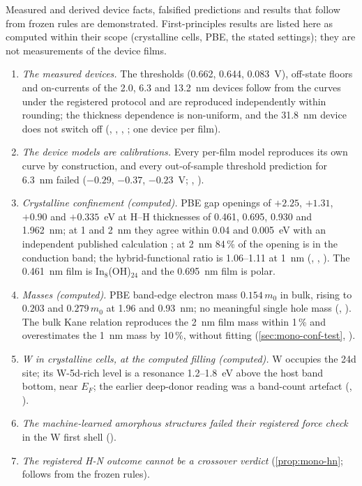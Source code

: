Measured and derived device facts, falsified predictions and results that follow from frozen rules are demonstrated.
First-principles results are listed here as computed within their scope (crystalline cells, PBE, the stated settings);
they are not measurements of the device films.
\begin{enumerate}
\item \emph{The measured devices.} The thresholds (0.662, 0.644, 0.083~V), off-state floors and on-currents of the
2.0, 6.3 and 13.2~nm devices follow from the curves under the registered protocol and are reproduced independently
within rounding; the thickness dependence is non-uniform, and the 31.8~nm device does not switch off
(, , , ; one device per film).
\item \emph{The device models are calibrations.} Every per-film model reproduces its own curve by construction, and every
out-of-sample threshold prediction for 6.3~nm failed ($-0.29$, $-0.37$, $-0.23$~V; , ).
\item \emph{Crystalline confinement (computed).} PBE gap openings of $+2.25$, $+1.31$, $+0.90$ and $+0.335$~eV at H--H
thicknesses of 0.461, 0.695, 0.930 and 1.962~nm; at 1 and 2~nm they agree within 0.04 and 0.005~eV with an independent
published calculation \citep{Lin2022}; at 2~nm 84\,\% of the opening is in the conduction band; the hybrid-functional
ratio is 1.06--1.11 at 1~nm (, , ). The 0.461~nm film is In$_8$(OH)$_{24}$ and the
0.695~nm film is polar.
\item \emph{Masses (computed).} PBE band-edge electron mass $0.154\,m_0$ in bulk, rising to $0.203$ and $0.279\,m_0$ at
1.96 and 0.93~nm; no meaningful single hole mass (, ). The bulk Kane relation reproduces the
2~nm film mass within 1\,\% and overestimates the 1~nm mass by 10\,\%, without fitting (\cref{sec:mono-conf-test},
).
\item \emph{W in crystalline cells, at the computed filling (computed).} W occupies the 24d site; its W-5d-rich level is a
resonance 1.2--1.8~eV above the host band bottom, near $E_F$; the earlier deep-donor reading was a band-count artefact
(, ).
\item \emph{The machine-learned amorphous structures failed their registered force check} in the W first shell
().
\item \emph{The registered H-N outcome cannot be a crossover verdict} (\cref{prop:mono-hn}; follows from the frozen
rules).
\end{enumerate}


